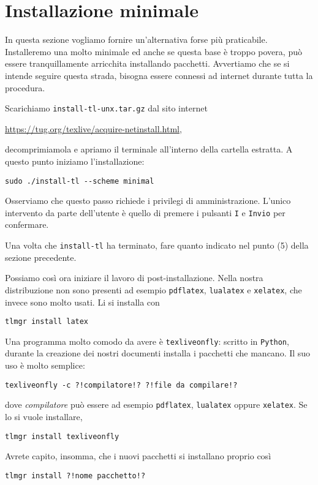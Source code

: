 
\section{Installazione minimale}

In questa sezione vogliamo fornire un'alternativa forse più praticabile. Installeremo una \texlive{} molto minimale ed anche se questa base è troppo povera, può essere tranquillamente arricchita installando pacchetti. Avvertiamo che se si intende seguire questa strada, bisogna essere connessi ad internet durante tutta la procedura.

Scarichiamo \lstinline£install-tl-unx.tar.gz£ dal sito internet
\begin{center}
\url{https://tug.org/texlive/acquire-netinstall.html},
\end{center}
decomprimiamola e apriamo il terminale all'interno della cartella estratta. A questo punto iniziamo l'installazione:

\begin{lstlisting}
sudo ./install-tl --scheme minimal
\end{lstlisting}

Osserviamo che questo passo richiede i privilegi di amministrazione. L'unico intervento da parte dell'utente è quello di premere i pulsanti \lstinline£I£ e \lstinline£Invio£ per confermare.

Una volta che \lstinline£install-tl£ ha terminato, fare quanto indicato nel punto (5) della sezione precedente.

Possiamo così ora iniziare il lavoro di post-installazione. Nella nostra distribuzione non sono presenti ad esempio \lstinline£pdflatex£, \lstinline£lualatex£ e \lstinline£xelatex£, che invece sono molto usati. Li si installa con

\begin{lstlisting}
tlmgr install latex
\end{lstlisting}

Una programma molto comodo da avere è \lstinline£texliveonfly£: scritto in \lstinline£Python£, durante la creazione dei nostri documenti installa i pacchetti che mancano. Il suo uso è molto semplice:
\begin{lstlisting}
texliveonfly -c ?!compilatore!? ?!file da compilare!?
\end{lstlisting}
dove {\em compilatore} può essere ad esempio \lstinline£pdflatex£, \lstinline£lualatex£ oppure \lstinline£xelatex£. Se lo si vuole installare,

\begin{lstlisting}
tlmgr install texliveonfly
\end{lstlisting}

Avrete capito, insomma, che i nuovi pacchetti si installano proprio così
\begin{lstlisting}
tlmgr install ?!nome pacchetto!?
\end{lstlisting}
